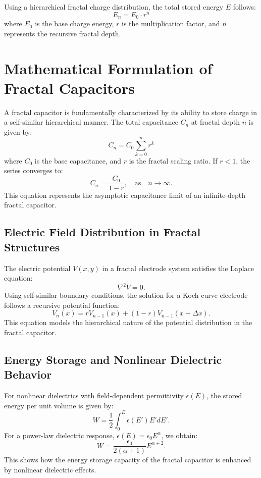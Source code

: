 \documentclass{article}
\theoremstyle{plain}
\begin{document}
Using a hierarchical fractal charge distribution, the total stored energy $E$ follows:
\begin{equation}
    E_n = E_0 \cdot r^n
\end{equation}
where $E_0$ is the base charge energy, $r$ is the multiplication factor, and $n$ represents the recursive fractal depth.

\section{Mathematical Formulation of Fractal Capacitors}

A fractal capacitor is fundamentally characterized by its ability to store charge in a self-similar hierarchical manner. The total capacitance $C_n$ at fractal depth $n$ is given by:
\begin{equation}
    C_n = C_0 \sum_{k=0}^{n} r^k
\end{equation}
where $C_0$ is the base capacitance, and $r$ is the fractal scaling ratio. If $r < 1$, the series converges to:
\begin{equation}
    C_n = \frac{C_0}{1 - r}, \quad \text{as} \quad n \to \infty.
\end{equation}
This equation represents the asymptotic capacitance limit of an infinite-depth fractal capacitor.

\subsection{Electric Field Distribution in Fractal Structures}
The electric potential $V(x,y)$ in a fractal electrode system satisfies the Laplace equation:
\begin{equation}
    \nabla^2 V = 0.
\end{equation}
Using self-similar boundary conditions, the solution for a Koch curve electrode follows a recursive potential function:
\begin{equation}
    V_n(x) = r V_{n-1}(x) + (1 - r)V_{n-1}(x + \Delta x).
\end{equation}
This equation models the hierarchical nature of the potential distribution in the fractal capacitor.

\subsection{Energy Storage and Nonlinear Dielectric Behavior}
For nonlinear dielectrics with field-dependent permittivity $\epsilon(E)$, the stored energy per unit volume is given by:
\begin{equation}
    W = \frac{1}{2} \int_0^E \epsilon(E') E' dE'.
\end{equation}
For a power-law dielectric response, $\epsilon(E) = \epsilon_0 E^{\alpha}$, we obtain:
\begin{equation}
    W = \frac{\epsilon_0}{2(\alpha + 1)} E^{\alpha + 2}.
\end{equation}
This shows how the energy storage capacity of the fractal capacitor is enhanced by nonlinear dielectric effects.
\end{document}
